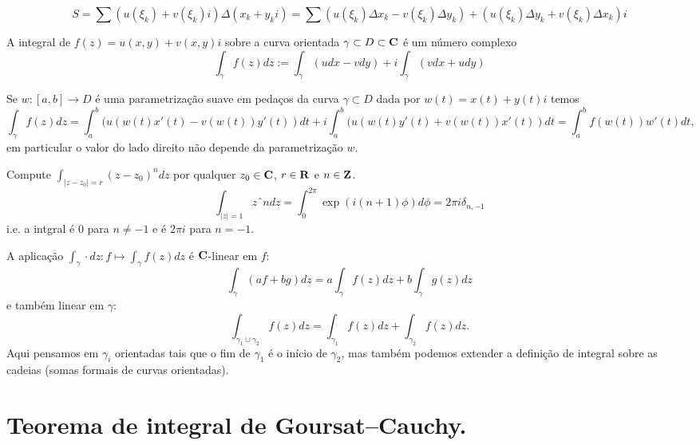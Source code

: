 $$ S = \sum (u(\xi_k)+v(\xi_k)i) \Delta (x_k + y_k i) 
= \sum (u(\xi_k) \Delta x_k - v(\xi_k) \Delta y_k) + (u(\xi_k) \Delta y_k + v(\xi_k) \Delta x_k)i $$

\begin{defin}
A integral de $f(z) = u(x,y) + v(x,y) i$ sobre a curva orientada $\gamma \subset D \subset \mathbf{C}$ é um número complexo
\[ \int_\gamma f(z) dz := \int_\gamma (u dx - v dy) + i \int_\gamma (v dx + u dy) \]
\end{defin}

Se $w: [a,b] \to D$ é uma parametrização suave em pedaços da curva $\gamma \subset D$
dada por $w(t) = x(t) + y(t) i$ temos
\begin{equation}
\int_\gamma f(z) dz = 
\int_a^b (u(w(t)x'(t)-v(w(t))y'(t))dt + i \int_a^b (u(w(t)y'(t)+v(w(t))x'(t))dt
= \int_a^b f(w(t)) w'(t) dt,
\end{equation}
em particular o valor do lado direito não depende da parametrização $w$.

\begin{exem}
Compute $\int_{|z-z_0|=r} (z-z_0)^n dz$ por qualquer $z_0\in\mathbf{C}$, $r\in\mathbf{R}$ e $n \in \mathbf{Z}$.
$$ \int_{|z|=1} zˆn dz = \int_0^{2\pi} \exp(i(n+1)\phi) d\phi = 2\pi i \delta_{n,-1} $$
i.e. a intgral é $0$ para $n\neq -1$ e é $2\pi i$ para $n=-1$.
\end{exem}

\begin{teorema}
A aplicação $\int_\gamma \cdot dz : f \mapsto \int_\gamma f(z) dz$ é $\mathbf{C}$-linear em $f$:
$$ \int_\gamma (a f + b g) dz = a \int_\gamma f(z) dz + b \int_\gamma g(z) dz $$
e também linear em $\gamma$:
$$ \int_{\gamma_1 \cup \gamma_2} f(z) dz = \int_{\gamma_1} f(z) dz + \int_{\gamma_2} f(z) dz.$$
Aqui pensamos em $\gamma_i$ orientadas tais que o fim de $\gamma_1$ é o início de $\gamma_2$,
mas também podemos extender a definição de integral sobre as cadeias (somas formais de curvas orientadas).
\end{teorema}

\section{Teorema de integral de Goursat--Cauchy.}

